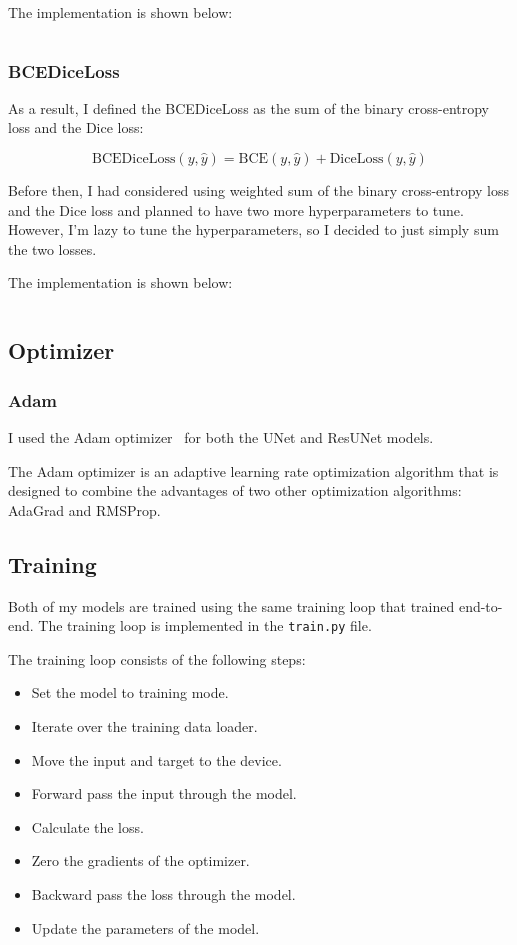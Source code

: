 The implementation is shown below:

\inputminted[firstline=46, lastline=56, highlightlines={54-56}]{python}{../src/utils.py}

\subsubsection{BCEDiceLoss}

As a result, I defined the BCEDiceLoss as the sum of the binary cross-entropy loss and the Dice loss:

\begin{equation}
    \text{BCEDiceLoss}(y, \hat{y}) = \text{BCE}(y, \hat{y}) + \text{DiceLoss}(y, \hat{y})
\end{equation}

Before then, I had considered using weighted sum of the binary cross-entropy loss and the Dice loss and planned to have two more hyperparameters to tune.
However, I'm lazy to tune the hyperparameters, so I decided to just simply sum the two losses.

The implementation is shown below:

\inputminted[firstline=59, highlightlines={65}]{python}{../src/utils.py}

\subsection{Optimizer}

\subsubsection{Adam}

I used the Adam optimizer~\cite{Adam} for both the UNet and ResUNet models.

The Adam optimizer is an adaptive learning rate optimization algorithm that is designed to combine the advantages of two other optimization algorithms: AdaGrad and RMSProp.

\subsection{Training}

Both of my models are trained using the same training loop that trained end-to-end.
The training loop is implemented in the \texttt{train.py} file.

The training loop consists of the following steps:
\begin{itemize}
    \item Set the model to training mode.
    \item Iterate over the training data loader.
    \item Move the input and target to the device.
    \item Forward pass the input through the model.
    \item Calculate the loss.
    \item Zero the gradients of the optimizer.
    \item Backward pass the loss through the model.
    \item Update the parameters of the model.
\end{itemize}

